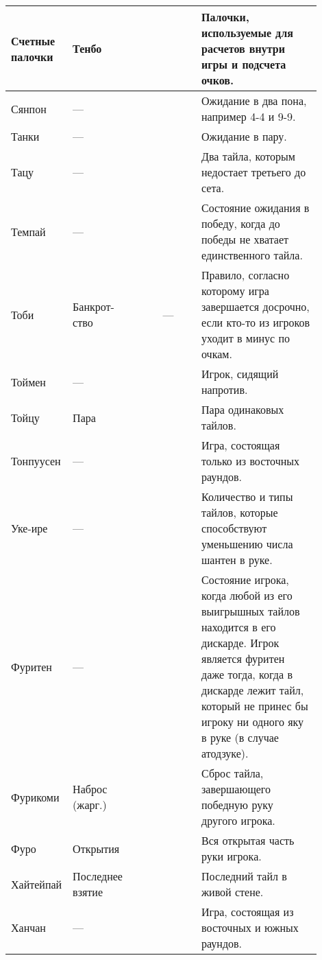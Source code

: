 \begin{tabularx}{\linewidth}{L{0.14\linewidth}L{0.13\linewidth}L{0.1\linewidth}L{0.13\linewidth}L{0.4\linewidth}}
	\midrule
	Счетные палочки & Тенбо &  &  & Палочки, используемые для расчетов внутри игры и подсчета очков. \\
	\midrule
	Сянпон & --- &  &  & Ожидание в два пона, например 4-4 и 9-9. \\
	\midrule
	Танки & --- &  &  & Ожидание в пару. \\
	\midrule
	Тацу & --- &  &  & Два тайла, которым недостает третьего до сета. \\
	\midrule
	Темпай & --- &  &  & Состояние ожидания в победу, когда до победы не хватает единственного тайла. \\
	\midrule
	Тоби & Банкрот-ство &  & --- & Правило, согласно которому игра завершается досрочно, если кто-то из игроков уходит в минус по очкам. \\
	\midrule
	Тоймен & --- &  &  & Игрок, сидящий напротив. \\
	\midrule
	Тойцу & Пара &  &  & Пара одинаковых тайлов. \\
	\midrule
	Тонпуусен & --- &  &  & Игра, состоящая только из восточных раундов. \\
	\midrule
	Уке-ире & --- &  &  & Количество и типы тайлов, которые способствуют уменьшению числа шантен в руке. \\
	\midrule
	Фуритен & --- &  &  & Состояние игрока, когда любой из его выигрышных тайлов находится в его дискарде. Игрок является фуритен даже тогда, когда в дискарде лежит тайл, который не принес бы игроку ни одного яку в руке (в случае атодзуке). \\
	\midrule
	Фурикоми & Наброс (жарг.) &  &  & Сброс тайла, завершающего победную руку другого игрока. \\
	\midrule
	Фуро & Открытия &  &  & Вся открытая часть руки игрока. \\
	\midrule
	Хайтейпай & Последнее взятие &  &  & Последний тайл в живой стене. \\
	\midrule
	Ханчан & --- &  &  & Игра, состоящая из восточных и южных раундов. \\

\end{tabularx}
